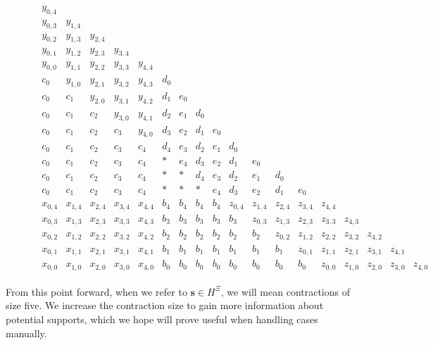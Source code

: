 \begin{figure}[H]
    \begin{align*}
        \begin{array}{cccccccccccccccccccc}
            y_{0,4} & & & & & & & & & & & & \\
            y_{0,3} & y_{1,4} & & & & & & & & & & & \\
            y_{0,2} & y_{1,3} & y_{2,4} & & & & & & & & & & \\
            y_{0,1} & y_{1,2} & y_{2,3} & y_{3,4} & & & & & & & & & \\
            y_{0,0} & y_{1,1} & y_{2,2} & y_{3,3} & y_{4,4} & & & & & & & & \\
            c_0 & y_{1,0} & y_{2,1} & y_{3,2} & y_{4,3} & d_0 & & & & & & & \\
            c_0 & c_1 & y_{2,0} & y_{3,1} & y_{4,2} & d_1 & e_0 & & & & & & \\
            c_0 & c_1 & c_2 & y_{3,0} & y_{4,1} & d_2 & e_1 & d_0 & & & & & \\
            c_0 & c_1 & c_2 & c_3 &  y_{4,0}  & d_3 & e_2 & d_1 & e_0 & & & & \\
            c_0 & c_1 & c_2 & c_3 &  c_4  & d_4 & e_3 & d_2 & e_1 & d_0 & & & \\
            c_0 & c_1 & c_2 & c_3 &  c_4  & * & e_4 & d_3 & e_2 & d_1 & e_0 & & \\
            c_0 & c_1 & c_2 & c_3 &  c_4  & * & * & d_4 & e_3 & d_2 & e_1 & d_0 & \\
            c_0 & c_1 & c_2 & c_3 &  c_4  & * & * & * & e_4 & d_3 & e_2 & d_1 & e_0 \\
            x_{0,4} & x_{1,4} & x_{2,4} & x_{3,4} &  x_{4,4}  & b_4 & b_4 & b_4 & b_4 & z_{0,4} & z_{1,4} & z_{2,4} & z_{3,4} & z_{4,4} \\
            x_{0,3} & x_{1,3} & x_{2,3} & x_{3,3} & x_{4,3} & b_3 & b_3 & b_3 & b_3 & b_3 & z_{0,3} & z_{1,3} & z_{2,3} & z_{3,3} & z_{4,3} \\
            x_{0,2} & x_{1,2} & x_{2,2} & x_{3,2} & x_{4,2} & b_2 & b_2 & b_2 & b_2 & b_2 & b_2 & z_{0,2} & z_{1,2} & z_{2,2} & z_{3,2} & z_{4,2}\\
            x_{0,1} & x_{1,1} & x_{2,1} & x_{3,1} & x_{4,1} & b_1 & b_1 & b_1 & b_1 & b_1 & b_1 & b_1 & z_{0,1} & z_{1,1} & z_{2,1} & z_{3,1} & z_{4,1} \\
            x_{0,0} & x_{1,0} & x_{2,0} & x_{3,0} & x_{4,0} & b_0 & b_0 & b_0 & b_0 & b_0 & b_0 & b_0 & b_0 & z_{0,0} & z_{1,0} & z_{2,0} & z_{3,0} & z_{4,0}
        \end{array}
    \end{align*}  
\end{figure}
From this point forward, when we refer to \( \mathbf{s} \in H^{\Xi} \), we will mean contractions of size five. We increase the contraction size to gain more information about potential supports, which we hope will prove useful when handling cases manually.

